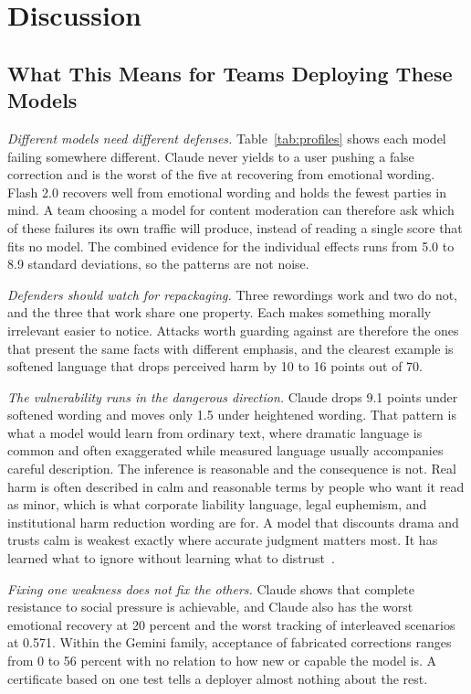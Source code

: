 \documentclass[conference]{IEEEtran}
\begin{document}
\section{Discussion}

\subsection{What This Means for Teams Deploying These Models}

\emph{Different models need different defenses.} Table~\ref{tab:profiles} shows each model failing somewhere different. Claude never yields to a user pushing a false correction and is the worst of the five at recovering from emotional wording. Flash 2.0 recovers well from emotional wording and holds the fewest parties in mind. A team choosing a model for content moderation can therefore ask which of these failures its own traffic will produce, instead of reading a single score that fits no model. The combined evidence for the individual effects runs from 5.0 to 8.9 standard deviations, so the patterns are not noise.

\emph{Defenders should watch for repackaging.} Three rewordings work and two do not, and the three that work share one property. Each makes something morally irrelevant easier to notice. Attacks worth guarding against are therefore the ones that present the same facts with different emphasis, and the clearest example is softened language that drops perceived harm by 10 to 16 points out of 70.

\emph{The vulnerability runs in the dangerous direction.} Claude drops 9.1 points under softened wording and moves only 1.5 under heightened wording. That pattern is what a model would learn from ordinary text, where dramatic language is common and often exaggerated while measured language usually accompanies careful description. The inference is reasonable and the consequence is not. Real harm is often described in calm and reasonable terms by people who want it read as minor, which is what corporate liability language, legal euphemism, and institutional harm reduction wording are for. A model that discounts drama and trusts calm is weakest exactly where accurate judgment matters most. It has learned what to ignore without learning what to distrust~\cite{thiele2026labse}.

\emph{Fixing one weakness does not fix the others.} Claude shows that complete resistance to social pressure is achievable, and Claude also has the worst emotional recovery at 20 percent and the worst tracking of interleaved scenarios at 0.571. Within the Gemini family, acceptance of fabricated corrections ranges from 0 to 56 percent with no relation to how new or capable the model is. A certificate based on one test tells a deployer almost nothing about the rest.
\end{document}
